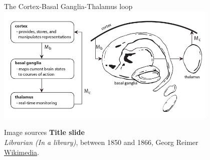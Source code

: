 \documentclass[handout,aspectratio=169]{beamer}
\begin{document}
	\begin{frame}{The Cortex-Basal Ganglia-Thalamus loop}
		\centering
		\includegraphics[width=0.8\textwidth]{media/ctx-bg-thal.png}
	\end{frame}


	\backupbegin

	\begin{frame}[noframenumbering]{Image sources}
		\small
		\textbf{Title slide}\\\emph{Librarian (In a library)}, between 1850 and 1866,  Georg Reimer\\ \href{https://commons.wikimedia.org/wiki/File:Reimer_Librarian.jpg}{Wikimedia}.
	\end{frame}

	\backupend
	
\end{document}
